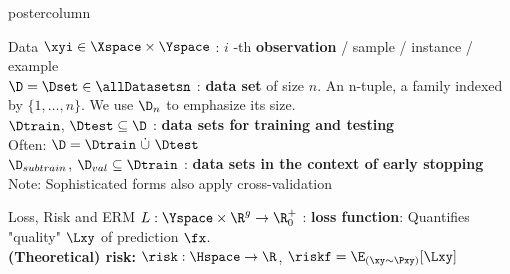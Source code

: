 \documentclass{beamer}
\begin{document}
\begin{frame}[fragile]{}
\begin{columns}
\begin{column}{.31\textwidth}
\begin{beamercolorbox}[center]{postercolumn}
\begin{minipage}{.98\textwidth}
{\begin{myblock}{Data}
$\xyi \in \Xspace\times \Yspace$ : $i$ -th \textbf{observation} / sample / instance / example\\

% 

$\D = \Dset \in \allDatasetsn $ : \textbf{data set} of size $n$.
An n-tuple, a family indexed by $\{1, \dots, n\}$. 
We use $\D_n$ to emphasize its size.\\
 
$\Dtrain$, $\Dtest \subseteq \D$ : \textbf{data sets for training and testing} \\ 
Often: $\D = \Dtrain ~ \dot{\cup} ~ \Dtest$\\

$\D_{subtrain}$, $\D_{val} \subseteq \Dtrain$ : \textbf{data sets in the context of early stopping} \\ 
Note: Sophisticated forms also apply cross-validation\\
 


% 
% 
  
\end{myblock}
\begin{myblock}{Loss, Risk and ERM}
  $L: \Yspace \times \R^g \to \R^+_0$ : \textbf{loss function}:
 Quantifies "quality" $\Lxy$ of prediction $\fx$. \\

\textbf{(Theoretical) risk:} $\risk:  \Hspace \to \R $,
$\riskf = \E_{(\xy \sim \Pxy)}[\Lxy]$ \\


\end{myblock}}
\end{minipage}
\end{beamercolorbox}
\end{column}
\end{columns}
\end{frame}
\end{document}
